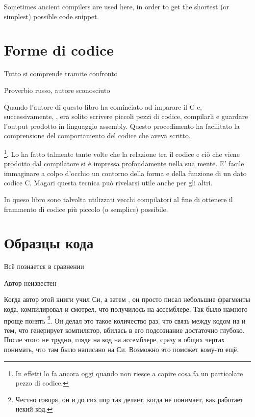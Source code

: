 
Sometimes ancient compilers are used here, in order to get the shortest (or simplest) possible code snippet.
\fi %

\ifdefined\ITALIAN
\part{Forme di codice}

\epigraph{Tutto si comprende tramite confronto}{Proverbio russo, autore sconosciuto}

Quando l'autore di questo libro ha cominciato ad imparare il C e, successivamente, \Cpp, era solito scrivere piccoli pezzi di codice, compilarli e guardare l'output prodotto in linguaggio assembly. Questo procedimento ha facilitato la comprensione del comportamento del codice che aveva scritto.

\footnote{In effetti lo fa ancora oggi quando non riesce a capire cosa fa un particolare pezzo di codice.}. 
Lo ha fatto talmente tante volte che la relazione tra il codice \CCpp e ciò che viene prodotto dal compilatore si è impressa profondamente nella sua mente. E' facile immaginare a colpo d'occhio un contorno della forma e della funzione di un dato codice C. 
Magari questa tecnica può rivelarsi utile anche per gli altri.


In queso libro sono talvolta utilizzati vecchi compilatori al fine di ottenere il frammento di codice più piccolo (o semplice) possibile.
\fi %

\ifdefined\RUSSIAN
\part{Образцы кода}
\epigraph{Всё познается в сравнении}{Автор неизвестен}

Когда автор этой книги учил Си, а затем \Cpp, он просто писал небольшие фрагменты кода, компилировал и смотрел, что 
получилось на ассемблере. Так было намного проще понять%
\footnote{Честно говоря, он и до сих пор так делает, когда не понимает, как работает некий код.}.
Он делал это такое количество раз, что связь между кодом на \CCpp и тем, что генерирует компилятор, вбилась в его подсознание достаточно глубоко.
После этого не трудно, глядя на код на ассемблере, сразу в общих чертах понимать, что там было написано на Си. 
Возможно это поможет кому-то ещё.


